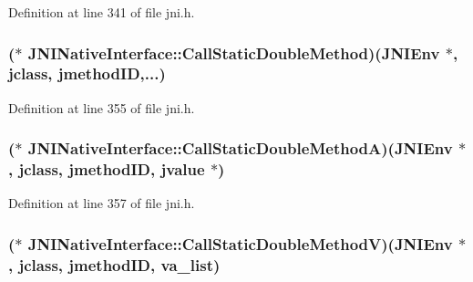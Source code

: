 Definition at line 341 of file jni.\-h.

\hypertarget{struct_j_n_i_native_interface_a5087364670b0d6cbd3b9312cd31c8627}{
\subsubsection[{Call\-Static\-Double\-Method}]{($\ast$ J\-N\-I\-Native\-Interface\-::\-Call\-Static\-Double\-Method)({\bf J\-N\-I\-Env} $\ast$, {\bf jclass}, {\bf jmethod\-I\-D},...)}}\label{struct_j_n_i_native_interface_a5087364670b0d6cbd3b9312cd31c8627}


Definition at line 355 of file jni.\-h.

\hypertarget{struct_j_n_i_native_interface_a238ad066b85942390db49100cbcfbbd2}{
\subsubsection[{Call\-Static\-Double\-Method\-A}]{($\ast$ J\-N\-I\-Native\-Interface\-::\-Call\-Static\-Double\-Method\-A)({\bf J\-N\-I\-Env} $\ast$, {\bf jclass}, {\bf jmethod\-I\-D}, {\bf jvalue} $\ast$)}}\label{struct_j_n_i_native_interface_a238ad066b85942390db49100cbcfbbd2}


Definition at line 357 of file jni.\-h.

\hypertarget{struct_j_n_i_native_interface_a72f8db438fe0bdebc32ff430ec5588a7}{
\subsubsection[{Call\-Static\-Double\-Method\-V}]{($\ast$ J\-N\-I\-Native\-Interface\-::\-Call\-Static\-Double\-Method\-V)({\bf J\-N\-I\-Env} $\ast$, {\bf jclass}, {\bf jmethod\-I\-D}, va\-\_\-list)}}\label{struct_j_n_i_native_interface_a72f8db438fe0bdebc32ff430ec5588a7}


